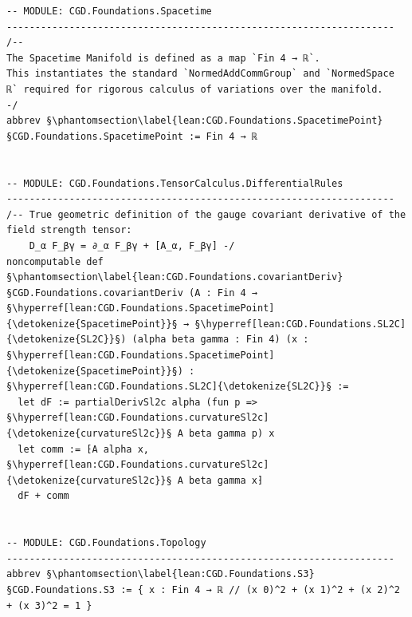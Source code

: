 \begin{verbatim}
-- MODULE: CGD.Foundations.Spacetime
--------------------------------------------------------------------
/--
The Spacetime Manifold is defined as a map `Fin 4 → ℝ`.
This instantiates the standard `NormedAddCommGroup` and `NormedSpace ℝ` required for rigorous calculus of variations over the manifold.
-/
abbrev §\phantomsection\label{lean:CGD.Foundations.SpacetimePoint}§CGD.Foundations.SpacetimePoint := Fin 4 → ℝ


-- MODULE: CGD.Foundations.TensorCalculus.DifferentialRules
--------------------------------------------------------------------
/-- True geometric definition of the gauge covariant derivative of the field strength tensor:
    D_α F_βγ = ∂_α F_βγ + [A_α, F_βγ] -/
noncomputable def §\phantomsection\label{lean:CGD.Foundations.covariantDeriv}§CGD.Foundations.covariantDeriv (A : Fin 4 → §\hyperref[lean:CGD.Foundations.SpacetimePoint]{\detokenize{SpacetimePoint}}§ → §\hyperref[lean:CGD.Foundations.SL2C]{\detokenize{SL2C}}§) (alpha beta gamma : Fin 4) (x : §\hyperref[lean:CGD.Foundations.SpacetimePoint]{\detokenize{SpacetimePoint}}§) : §\hyperref[lean:CGD.Foundations.SL2C]{\detokenize{SL2C}}§ :=
  let dF := partialDerivSl2c alpha (fun p => §\hyperref[lean:CGD.Foundations.curvatureSl2c]{\detokenize{curvatureSl2c}}§ A beta gamma p) x
  let comm := ⁅A alpha x, §\hyperref[lean:CGD.Foundations.curvatureSl2c]{\detokenize{curvatureSl2c}}§ A beta gamma x⁆
  dF + comm


-- MODULE: CGD.Foundations.Topology
--------------------------------------------------------------------
abbrev §\phantomsection\label{lean:CGD.Foundations.S3}§CGD.Foundations.S3 := { x : Fin 4 → ℝ // (x 0)^2 + (x 1)^2 + (x 2)^2 + (x 3)^2 = 1 }



\end{verbatim}

